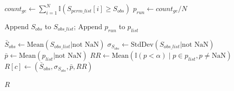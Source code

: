 \begin{algorithm}[H]
\begin{algorithmic}[1]
        \State $count_{ge} \leftarrow \sum_{i=1}^{N} \mathbb{I}(S_{perm\_list}[i] \ge S_{obs})$
        \State $p_{run} \leftarrow count_{ge} / N$ 
        \medskip

        \State Append $S_{obs}$ to $S_{obs\_list}$; Append $p_{run}$ to $p_{list}$ 
        \EndFor {}
        \medskip

        \State $\bar{S}_{obs} \leftarrow \text{Mean}(S_{obs\_list} | \text{not NaN})$ 
        \State $\sigma_{S_{obs}} \leftarrow \text{StdDev}(S_{obs\_list} | \text{not NaN})$ 
        \State $\bar{p} \leftarrow \text{Mean}(p_{list} | \text{not NaN})$ 
        \State $RR \leftarrow \text{Mean}(\mathbb{I}(p < \alpha) \mid p \in p_{list}, p \neq \text{NaN})$ 
        \State $R[c] \leftarrow (\bar{S}_{obs}, \sigma_{S_{obs}}, \bar{p}, RR)$ 
        \medskip
        \EndFor {}

        \State \Return $R$

    \end{algorithmic}
\end{algorithm}

